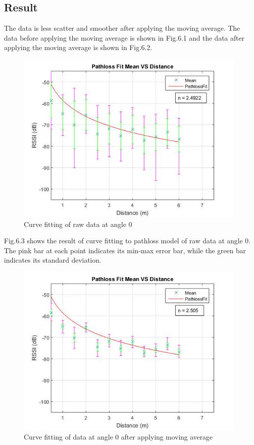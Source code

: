 \subsection*{Result}
The data is less scatter and smoother after applying the moving average. The data before applying the moving average is shown in Fig.6.1 and the data after applying the moving average is shown in Fig.6.2.

\begin{figure}[H]
\centering
\includegraphics[width=\textwidth]{Image/rawCurveFit0.jpg}
\caption{Curve fitting of raw data at angle 0}
\label{}
\end{figure}

Fig.6.3 shows the result of curve fitting to pathloss model of raw data at angle 0. The pink bar at each point indicates its min-max error bar, while the green bar indicates its standard deviation.

\begin{figure}[H]
\centering
\includegraphics[width=\textwidth]{Image/curveFit0.jpg}
\caption{Curve fitting of data at angle 0 after applying moving average}
\label{}
\end{figure}

